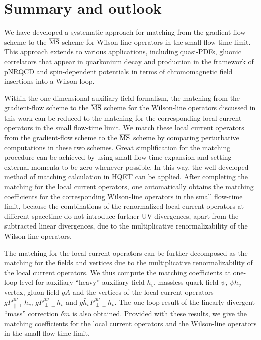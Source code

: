 \section{Summary and outlook}
\label{sec:summary}
We have developed a systematic approach for matching from the gradient-flow scheme to the $\overline{\rm MS}$ scheme for Wilson-line operators in the small flow-time limit. This approach extends to various applications, including quasi-PDFs, gluonic correlators that appear in quarkonium decay and production in the framework of pNRQCD and spin-dependent potentials in terms of chromomagnetic field insertions into a Wilson loop.

Within the one-dimensional auxiliary-field formalism, the matching from the gradient-flow scheme to the $\overline{\rm MS}$ scheme for the Wilson-line operators discussed in this work can be reduced to the matching for the corresponding local current operators in the small flow-time limit.
We match these local current operators from the gradient-flow scheme to the $\overline{\rm MS}$ scheme by comparing perturbative computations in these two schemes.
Great simplification for the matching procedure can be achieved by using small flow-time expansion and setting external momenta to be zero whenever possible.
In this way, the well-developed method of matching calculation in HQET can be applied. After completing the matching for the local current operators, one automatically obtains the matching coefficients for the corresponding Wilson-line operators in the small flow-time limit,
because the combinations of the renormalized local current operators at different spacetime do not introduce further UV divergences, apart from the subtracted linear divergences, due to the multiplicative renormalizability of the Wilson-line operators.


The matching for the local current operators can be further decomposed as the matching for the fields and vertices due to the multiplicative renormalizability of the local current operators.
We thus compute the matching coefficients at one-loop level for auxiliary ``heavy” auxiliary field $h_v$,  massless quark field $\psi$, $\psi h_v$ vertex,  gluon field $gA$ and the vertices of the local current operators  $gF^{\mu\nu}_{\|\perp}h_v,\, gF^{\mu\nu}_{\perp\perp}h_v$ and $g\bar{h}_vF^{\mu\nu}_{\perp\perp}h_v$. The one-loop result of the linearly divergent ``mass” correction $\delta m$ is also obtained. Provided with these results, we give the matching coefficients for the local current operators and the Wilson-line operators in the small flow-time limit. 

